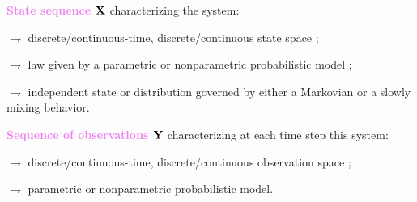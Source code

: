 \documentclass[9pt]{beamer}
\begin{document}
\begin{frame}
\textcolor{violet}{{\bf State sequence ${\bf X}$}} characterizing the system:

\vspace{.2cm}

$\rightharpoondown$ \; discrete/\textcolor{lighto}{continuous-time}, discrete/\textcolor{lighto}{continuous} state space ;

\vspace{.2cm}

$\rightharpoondown$ \; law given by a \textcolor{lighto}{parametric} or nonparametric probabilistic model ;

\vspace{.2cm}


$\rightharpoondown$ \; \alert{independent state} or distribution governed by either a	\textcolor{lighto}{Markovian} or a slowly mixing behavior.

\vspace{.5cm}

\textcolor{violet}{{\bf Sequence of observations ${\bf Y}$}} characterizing at each time step this system:

\vspace{.2cm}

$\rightharpoondown$ \; \textcolor{lighto}{discrete}/continuous-time, discrete/\textcolor{lighto}{continuous} observation space ;

\vspace{.2cm}

$\rightharpoondown$ \; parametric or \textcolor{lighto}{nonparametric} probabilistic model.

\end{frame}
\end{document}
